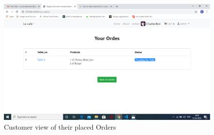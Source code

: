 \documentclass[12pt,a4paper]{report}
\begin{document}
\begin{appendices}
	\begin{figure}[h!]
		\centering
		\includegraphics[scale=0.3]{13}
		\caption{Customer view of their placed Orders}
		\label{Architecture}
		\end{figure}	
	
\end{appendices}
\end{document}
